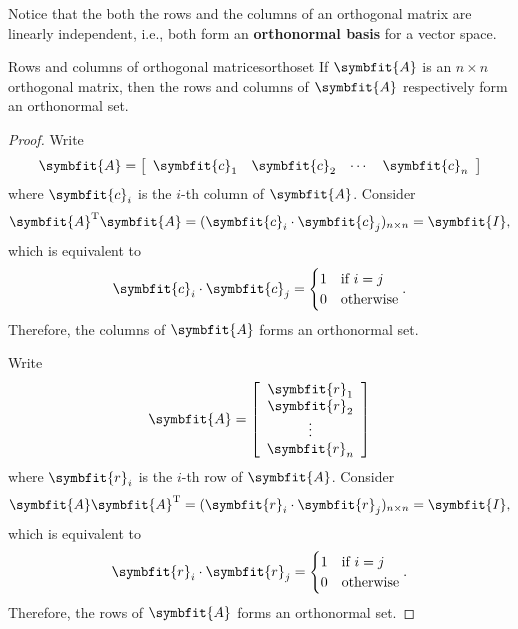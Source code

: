 \documentclass[math]{amznotes}
\theoremstyle{remark}
\begin{document}
Notice that the both the rows and the columns of an orthogonal matrix are linearly independent, i.e., both form an {\color{red} \textbf{orthonormal basis}} for a vector space.
\begin{thmbox}{Rows and columns of orthogonal matrices}{orthoset}
    If $\symbfit{A}$ is an $n \times n$ orthogonal matrix, then the rows and columns of $\symbfit{A}$ respectively form an orthonormal set.
    \tcblower
    \begin{proof}
        Write 
        \begin{displaymath}
            \symbfit{A} = \left[\begin{array}{cccc}
                \symbfit{c}_1 & \symbfit{c}_2 & \cdots & \symbfit{c}_n 
            \end{array}\right]
        \end{displaymath}
        where $\symbfit{c}_i$ is the $i$-th column of $\symbfit{A}$. Consider
        \begin{equation*}
            \symbfit{A}^{\mathrm{T}}\symbfit{A} = (\symbfit{c}_i \cdot \symbfit{c}_j)_{n \times n} = \symbfit{I},
        \end{equation*}
        which is equivalent to
        \begin{displaymath}
            \symbfit{c}_i \cdot \symbfit{c}_j = \begin{cases}
                1 & \textrm{if } i = j \\
                0 & \textrm{otherwise}
            \end{cases}.
        \end{displaymath}
        Therefore, the columns of $\symbfit{A}$ forms an orthonormal set.

        Write 
        \begin{displaymath}
            \symbfit{A} = \left[\begin{array}{c}
                \symbfit{r}_1 \\
                \symbfit{r}_2 \\
                \vdots \\
                \symbfit{r}_n
            \end{array}\right]
        \end{displaymath}
        where $\symbfit{r}_i$ is the $i$-th row of $\symbfit{A}$. Consider
        \begin{equation*}
            \symbfit{A}\symbfit{A}^{\mathrm{T}} = (\symbfit{r}_i \cdot \symbfit{r}_j)_{n \times n} = \symbfit{I},
        \end{equation*}
        which is equivalent to
        \begin{displaymath}
            \symbfit{r}_i \cdot \symbfit{r}_j = \begin{cases}
                1 & \textrm{if } i = j \\
                0 & \textrm{otherwise}
            \end{cases}.
        \end{displaymath}
        Therefore, the rows of $\symbfit{A}$ forms an orthonormal set.
    \end{proof}
\end{thmbox}
\end{document}
